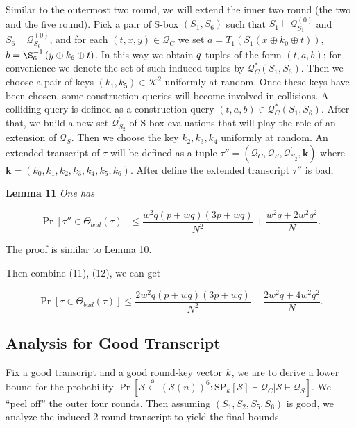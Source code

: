 Similar to the outermost two round, we will extend the inner two round (the two and the five round).  Pick a pair of S-box $(S_1, S_6)$ such that $S_{1} \vdash \mathcal{Q}_{S_{1}}^{(0)}$ and $S_{6} \vdash \mathcal{Q}_{S_{6}}^{(0)}$, and for each $ (t, x, y) \in \mathcal{Q}_{C}$ we set $a=T_{1}\left(S_{1}\left(x \oplus k_{0} \oplus t\right)\right)$, $b=\S_{6}^{-1}\left(y \oplus k_{6} \oplus t\right)$. In this way we obtain $\mathnormal{q}$ tuples of the form $(t, a, b)$; for convenience we denote the set of such induced tuples by $\mathcal{Q}_{C}^{*}\left(S_{1}, S_{6}\right)$. Then we choose a pair of keys $\left(k_{1}, k_{5}\right) \in \mathcal{K}^{2}$ uniformly at random. Once these keys have been chosen, some construction queries will become involved in collisions. A colliding query is defined as a construction query $(t, a, b) \in \mathcal{Q}_{C}^{*}\left(S_{1}, S_{6}\right)$. After that, we build a new set $\mathcal{Q}_{S_{2}}^{\prime}$ of S-box evaluations that will play the role of an extension of $\mathcal{Q}_{S}$. Then we choose the key $k_2, k_3, k_4$ uniformly at random. An extended transcript of $\tau$ will be defined as a tuple $\tau''=\left(\mathcal{Q}_{C}, \mathcal{Q}_{S}, \mathcal{Q}_{S_{2}}^{\prime}, \mathbf{k}\right)$ where $\mathbf{k}=\left(k_{0}, k_{1}, k_{2},k_{3},k_{4}, k_{5}, k_{6}\right)$. After define the extended transcript $\tau''$ is bad, 

\noindent \textbf{Lemma 11} \emph{One has}

\begin{equation}
\operatorname{Pr}[\tau'' \in \Theta_{bad}(\tau)] \leq \frac{w^2 q (p+w q) (3 p +w q)}{N^{2}} + \frac{w^{2} q + 2 w^2 q^2}{N}.
\end{equation}

\noindent The proof is similar to Lemma 10.

Then combine (11), (12), we can get

\begin{equation}
\operatorname{Pr}[\tau \in \Theta_{bad}(\tau)] \leq \frac{2w^2 q (p+w q) (3 p +w q)}{N^{2}} + \frac{2w^{2} q + 4 w^2 q^2}{N}.
\end{equation}


\subsection{Analysis for Good Transcript}

\noindent Fix a good transcript and a good round-key vector $\mathnormal{k}$, we are to derive a lower bound for the probability  $\operatorname{Pr}\left[\mathcal{S} \stackrel{\mathbf{s}}{\leftarrow}(\mathcal{S}(n))^{6}: \mathrm{SP}_{k}[\mathcal{S}] \vdash \mathcal{Q}_{C} | \mathcal{S} \vdash \mathcal{Q}_{S}\right]$. We ``peel off'' the outer four rounds. Then assuming $(S_{1}, S_2, S_{5}, S_6)$ is good, we analyze the induced 2-round transcript to yield the final bounds.\\


